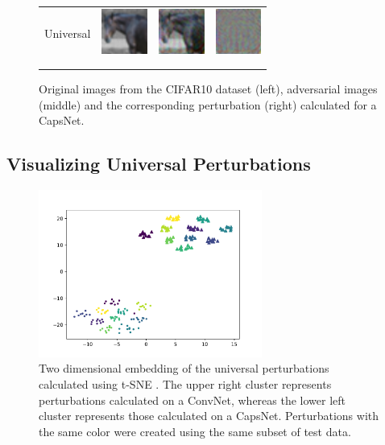 \documentclass{article}
\begin{document}
\begin{figure}[h]
\begin{tabular}{rlll}
		\\
		Universal & \includegraphics[height=1.5cm, align=c]{figures/universal_orig.pdf} & \includegraphics[height=1.5cm, align=c]{figures/universal_adversarial.pdf} & \includegraphics[height=1.5cm, align=c]{figures/universal_diff.pdf}\\
		\\
		\vspace{0.1cm}\\
	\end{tabular}
	\caption{Original images from the CIFAR10 dataset (left), adversarial images (middle) and the corresponding perturbation (right) calculated for a CapsNet.\label{tab:images}}
\end{figure}


\subsection{Visualizing Universal Perturbations}

\begin{figure}[h]
	\centering
	\includegraphics[height=5.5cm]{figures/tsne.pdf}
	\caption{Two dimensional embedding of the universal perturbations calculated using t-SNE \cite{tsne}. The upper right cluster represents perturbations calculated on a ConvNet, whereas the lower left cluster represents those calculated on a CapsNet. Perturbations with the same color were created using the same subset of test data.}
	\label{fig:tsne}
\end{figure}
\end{document}
